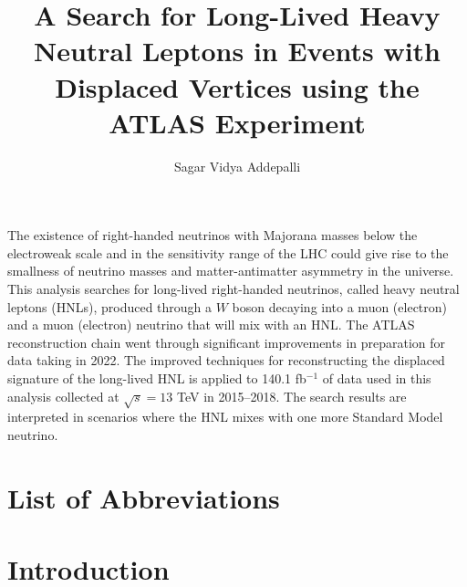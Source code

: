 \documentclass{brandeis-dissertation3.14}
\title{A Search for Long-Lived Heavy Neutral Leptons in Events with Displaced Vertices using the ATLAS Experiment}
\author{Sagar Vidya Addepalli}
\begin{document}
\maketitlepage
\makeapproval
\setlength{\cftchapnumwidth}{3em}
\setlength{\cfttabnumwidth}{3em}
\setlength{\cftfignumwidth}{3em}


\begin{dissertation-abstract}
The existence of right-handed neutrinos with Majorana masses below the electroweak scale and in the sensitivity range of the LHC could give rise to the smallness of neutrino masses and matter-antimatter asymmetry in the universe. This analysis searches for long-lived right-handed neutrinos, called heavy neutral leptons (HNLs), produced through a $W$ boson decaying into a muon (electron) and a muon (electron) neutrino that will mix with an HNL. The ATLAS reconstruction chain went through significant improvements in preparation for data taking in 2022. The improved techniques for reconstructing the displaced signature of the long-lived HNL is applied to 140.1 fb$^{-1}$ of data used in this analysis collected at $\sqrt{s}=13$ TeV in 2015--2018. The search results are interpreted in scenarios where the HNL mixes with one more Standard Model neutrino.
\end{dissertation-abstract}

\doublespacing

\tableofcontents{}

\clearpage

\listoftables
{}
\pagebreak
\listoffigures
{}
\pagebreak
\setcounter{secnumdepth}{0}
\chapter*{List of Abbreviations}

\setcounter{secnumdepth}{2}

\startbody


\chapter*{Introduction}
\label{chap:intro}

\end{document}
